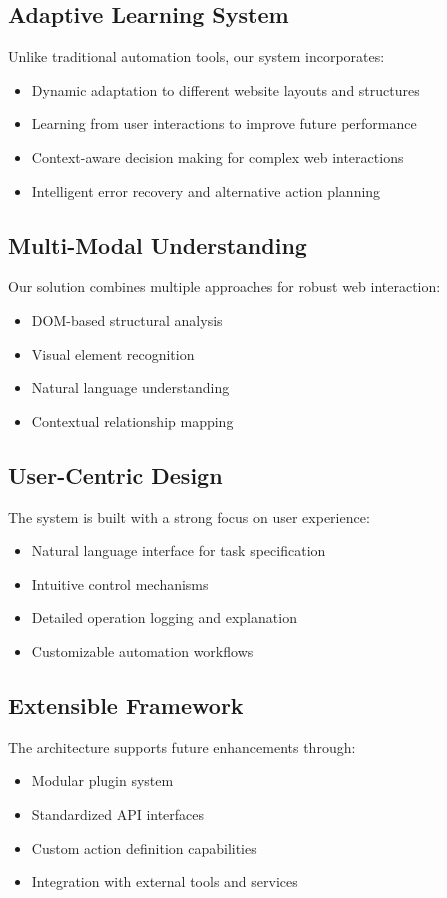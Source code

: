 \documentclass[conference]{IEEEtran}
\begin{document}
\subsection{Adaptive Learning System}
Unlike traditional automation tools, our system incorporates:
\begin{itemize}
    \item Dynamic adaptation to different website layouts and structures
    \item Learning from user interactions to improve future performance
    \item Context-aware decision making for complex web interactions
    \item Intelligent error recovery and alternative action planning
\end{itemize}

\subsection{Multi-Modal Understanding}
Our solution combines multiple approaches for robust web interaction:
\begin{itemize}
    \item DOM-based structural analysis
    \item Visual element recognition
    \item Natural language understanding
    \item Contextual relationship mapping
\end{itemize}

\subsection{User-Centric Design}
The system is built with a strong focus on user experience:
\begin{itemize}
    \item Natural language interface for task specification
    \item Intuitive control mechanisms
    \item Detailed operation logging and explanation
    \item Customizable automation workflows
\end{itemize}

\subsection{Extensible Framework}
The architecture supports future enhancements through:
\begin{itemize}
    \item Modular plugin system
    \item Standardized API interfaces
    \item Custom action definition capabilities
    \item Integration with external tools and services
\end{itemize}
\end{document}
